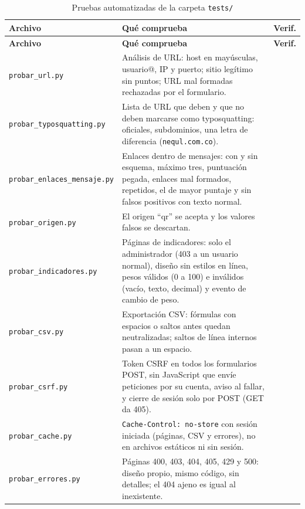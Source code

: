 \documentclass[journal,onecolumn,12pt,draftclsnofoot]{IEEEtran}
\begin{document}
\begingroup
\footnotesize
\setlength{\tabcolsep}{3pt}
\begin{longtable}{|>{\raggedright\arraybackslash}p{}|>{\raggedright\arraybackslash}p{}|>{\raggedright\arraybackslash}p{}|}
\caption{Pruebas automatizadas de la carpeta \texttt{tests/}}\label{tab:pruebas}\\
\hline
\textbf{Archivo} & \textbf{Qué comprueba} & \textbf{Verif.} \\ \hline
\endfirsthead
\hline
\textbf{Archivo} & \textbf{Qué comprueba} & \textbf{Verif.} \\ \hline
\endhead
\texttt{probar\_url.py} & Análisis de URL: host en mayúsculas, usuario@, IP y puerto; sitio legítimo sin puntos; URL mal formadas rechazadas por el formulario. & 6 \\ \hline
\texttt{probar\_typosquatting.py} & Lista de URL que deben y que no deben marcarse como typosquatting: oficiales, subdominios, una letra de diferencia (\texttt{nequl.com.co}). & 31 \\ \hline
\texttt{probar\_enlaces\_mensaje.py} & Enlaces dentro de mensajes: con y sin esquema, máximo tres, puntuación pegada, enlaces mal formados, repetidos, el de mayor puntaje y sin falsos positivos con texto normal. & 18 \\ \hline
\texttt{probar\_origen.py} & El origen ``qr'' se acepta y los valores falsos se descartan. & 10 \\ \hline
\texttt{probar\_indicadores.py} & Páginas de indicadores: solo el administrador (403 a un usuario normal), diseño sin estilos en línea, pesos válidos (0 a 100) e inválidos (vacío, texto, decimal) y evento de cambio de peso. & 9 \\ \hline
\texttt{probar\_csv.py} & Exportación CSV: fórmulas con espacios o saltos antes quedan neutralizadas; saltos de línea internos pasan a un espacio. & 6 \\ \hline
\texttt{probar\_csrf.py} & Token CSRF en todos los formularios POST, sin JavaScript que envíe peticiones por su cuenta, aviso al fallar, y cierre de sesión solo por POST (GET da 405). & 11 \\ \hline
\texttt{probar\_cache.py} & \texttt{Cache-Control: no-store} con sesión iniciada (páginas, CSV y errores), no en archivos estáticos ni sin sesión. & 4 \\ \hline
\texttt{probar\_errores.py} & Páginas 400, 403, 404, 405, 429 y 500: diseño propio, mismo código, sin detalles; el 404 ajeno es igual al inexistente. & 7 \\ \hline

\end{longtable}
\end{document}
